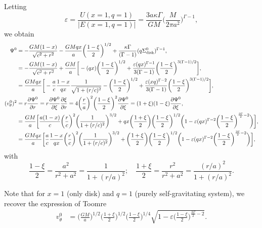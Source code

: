 \documentclass[11pt]{article}
\newcommand{\vt}{v_{\theta}}
\newcommand{\Sigmad}{\Sigma_{\rm{disk}}}
\begin{document}
Letting  $$\varepsilon = \frac{U(x=1,q=1)}{|E(x=1,q=1)|} =\frac{3a \kappa \Gamma}{GM} \bigg(\frac{M}{2\pi a^2}\bigg)^{\Gamma-1},$$  we obtain
\begin{align*}
\Psi^0 &=  - \frac{G M (1-x)}{\sqrt{c^2+r^2}}-\frac{G M qx}{a }\bigg(\frac{1-\xi}{2}\bigg)^{1/2} + \frac{\kappa \Gamma}{(\Gamma-1)} (q\Sigmad^0)^{\Gamma-1} ,\\
{}&=  -\frac{G M (1-x)}{\sqrt{c^2+r^2}}+\frac{G M }{a} \bigg[-(qx)\bigg(\frac{1-\xi}{2}\bigg)^{1/2} + \frac{\varepsilon(qx)^{\Gamma-1}}{3(\Gamma-1)}\bigg(\frac{1-\xi}{2}\bigg)^{3(\Gamma-1)/2} \bigg] ,\\
&=  \frac{G Mqx}{a}\bigg[-\frac{a}{c}\frac{ 1-x}{qx}\frac{1}{ \sqrt{1+(r/c)^2}} -\bigg(\frac{1-\xi}{2}\bigg)^{1/2} + \frac{\varepsilon(xq)^{\Gamma-2}}{3(\Gamma-1)}\bigg(\frac{1-\xi}{2}\bigg)^{3(\Gamma-1)/2} \bigg],\\
(\vt^0)^2 &= r \frac{\partial \Psi^0}{\partial r} =r \frac{\partial \Psi^0}{\partial \xi} \frac{\partial \xi}
{\partial r} = 4\bigg(\frac{r}{a}\bigg)^2    \bigg(\frac{1-\xi}{2}\bigg)^2 \frac{\partial \Psi^0}{\partial \xi}= (1+\xi) (1-\xi) \frac{\partial \Psi^0}{\partial \xi}  ,\\
&=\frac{GM}{a}\bigg[\frac{a(1-x)}{c}\bigg( \frac{r}{c}\bigg)^2 \bigg(\frac{1}{1+(r/c)^2}\bigg)^{3/2} 
+ qx\bigg(\frac{1+\xi}{2}\bigg) \bigg(\frac{1-\xi}{2}\bigg)^{1/2}  \bigg(1- \varepsilon(qx)^{\Gamma-2}\bigg(\frac{1-\xi}{2}\bigg)^{\frac{3\Gamma}{2}-2} \bigg) \bigg], \\
&=\frac{GMqx}{a}\bigg[\frac{a}{c}\frac{1-x}{qx}\bigg( \frac{r}{c}\bigg)^2 \bigg(\frac{1}{1+(r/c)^2}\bigg)^{3/2} 
+ \bigg(\frac{1+\xi}{2}\bigg) \bigg(\frac{1-\xi}{2}\bigg)^{1/2}  \bigg(1- \varepsilon(qx)^{\Gamma-2}\bigg(\frac{1-\xi}{2}\bigg)^{\frac{3\Gamma}{2}-2} \bigg) \bigg],
\end{align*}
with
$$\frac{1-\xi}{2}= \frac{a^2}{r^2+a^2}= \frac{1}{1+(r/a)^2}; \quad \frac{1+\xi}{2}= \frac{r^2}{r^2+a^2}= \frac{(r/a)^2}{1+(r/a)^2}.$$

Note that for $x=1$ (only disk) and $q=1$ (purely self-gravitating system), we recover the expression of Toomre
\begin{align*}
\vt^0 &=\bigg(\frac{GM}{a} \bigg)^{1/2}\bigg(\frac{1+\xi}{2}\bigg)^{1/2} \bigg(\frac{1-\xi}{2}\bigg)^{1/4}  \sqrt{1- \varepsilon \bigg(\frac{1-\xi}{2}\bigg)^{\frac{3\Gamma}{2}-2}} .
\end{align*}
\end{document}
